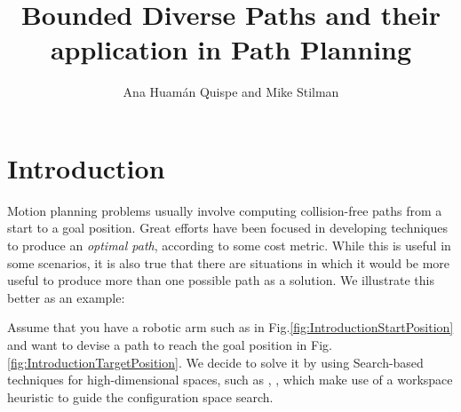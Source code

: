 \documentclass[graybox]{svmult}
\begin{document}
\title*{Bounded Diverse Paths and their application in Path Planning}
\author{Ana Huam\'an Quispe and Mike Stilman}

\maketitle



\section{Introduction}
\label{sec:Introduction}
Motion planning problems usually involve computing collision-free paths from a start to a goal position. Great efforts have been focused in developing techniques to produce an \emph{optimal path}, according to some cost metric. While this is useful in some scenarios, it is also true that there are situations in which it would be more useful to produce more than one possible path as a solution. We illustrate this better as an example:

Assume that you have a robotic arm such as in Fig.\ref{fig:IntroductionStartPosition} and want to devise a path to reach the goal position in Fig.\ref{fig:IntroductionTargetPosition}. We decide to solve it by using Search-based techniques for high-dimensional spaces, such as \cite{}, \cite{}, which make use of a workspace heuristic to guide the configuration space search. 
\end{document}
